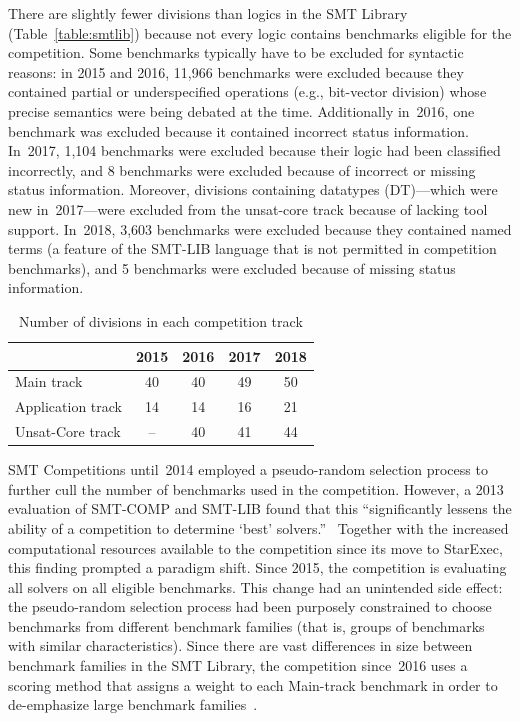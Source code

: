 \documentclass[dvipsnames,table,twoside,11pt]{article}
\begin{document}
There are slightly fewer divisions than logics in the SMT Library
(Table~\ref{table:smtlib}) because not every logic contains benchmarks
eligible for the competition.  Some benchmarks typically have to be
excluded for syntactic reasons: in 2015 and 2016, 11,966 benchmarks
were excluded because they contained partial or underspecified
operations (e.g., bit-vector division) whose precise semantics were
being debated at the time.  Additionally in~2016, one benchmark was
excluded because it contained incorrect status information.  In~2017,
1,104 benchmarks were excluded because their logic had been classified
incorrectly, and 8 benchmarks were excluded because of incorrect or
missing status information.  Moreover, divisions containing datatypes
({DT})---which were new in~2017---were excluded from the unsat-core
track because of lacking tool support.  In~2018, 3,603 benchmarks were
excluded because they contained named terms (a feature of the SMT-LIB
language that is not permitted in competition benchmarks), and 5
benchmarks were excluded because of missing status information.

\begin{table}
  \caption{Number of divisions in each competition track}
  \label{table:divisions}
  \centering
  \begin{tabular}{lcccc}
    \toprule
    & 2015 & 2016 & 2017 & 2018 \\
    \midrule
    Main track        &  40 & 40 & 49 & 50 \\
    Application track &  14 & 14 & 16 & 21 \\
    Unsat-Core track  &  -- & 40 & 41 & 44 \\
    \bottomrule
  \end{tabular}
\end{table}

SMT Competitions until~2014 employed a pseudo-random selection process
to further cull the number of benchmarks used in the competition.
However, a 2013 evaluation of SMT-COMP and SMT-LIB found that this
``significantly lessens the ability of a competition to determine
`best' solvers.''~\cite{CSW15} Together with the increased
computational resources available to the competition since its move to
StarExec, this finding prompted a paradigm shift.  Since 2015, the
competition is evaluating all solvers on all eligible benchmarks.
This change had an unintended side effect: the pseudo-random selection
process had been purposely constrained to choose benchmarks from
different benchmark families (that is, groups of benchmarks with
similar characteristics).  Since there are vast differences in size
between benchmark families in the SMT Library, the competition
since~2016 uses a scoring method that assigns a weight to each
Main-track benchmark in order to de-emphasize large benchmark
families~\cite{rules18}.
\end{document}
